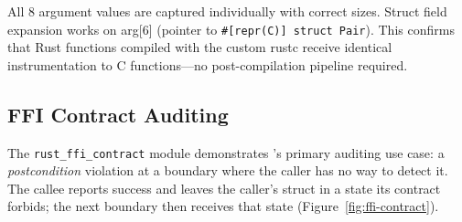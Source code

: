 \documentclass{article}
\begin{document}
All 8 argument values are captured individually with correct sizes. Struct
field expansion works on arg[6] (pointer to \texttt{\#[repr(C)] struct Pair}).
This confirms that Rust functions compiled with the custom rustc receive
identical instrumentation to C functions---no post-compilation pipeline
required.

\subsection{FFI Contract Auditing}

The \texttt{rust\_ffi\_contract} module demonstrates \toolname{}'s primary
auditing use case: a \emph{postcondition} violation at a boundary where the
caller has no way to detect it. The callee reports success and leaves the
caller's struct in a state its contract forbids; the next boundary then
receives that state (Figure~\ref{fig:ffi-contract}).
\end{document}
